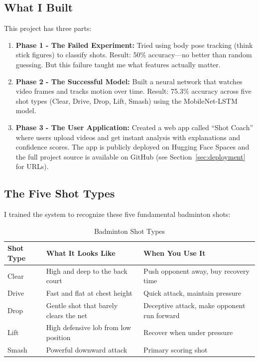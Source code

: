 \documentclass[11pt,a4paper]{article}
\begin{document}
\subsection{What I Built}

This project has three parts:

\begin{enumerate}
\item \textbf{Phase 1 - The Failed Experiment:} Tried using body pose tracking (think stick figures) to classify shots. Result: 50\% accuracy---no better than random guessing. But this failure taught me what features actually matter.

\item \textbf{Phase 2 - The Successful Model:} Built a neural network that watches video frames and tracks motion over time. Result: 75.3\% accuracy across five shot types (Clear, Drive, Drop, Lift, Smash) using the MobileNet-LSTM model.

\item \textbf{Phase 3 - The User Application:} Created a web app called ``Shot Coach'' where users upload videos and get instant analysis with explanations and confidence scores. The app is publicly deployed on Hugging Face Spaces and the full project source is available on GitHub (see Section~\ref{sec:deployment} for URLs).
\end{enumerate}

\subsection{The Five Shot Types}

I trained the system to recognize these five fundamental badminton shots:

\begin{table}[H]
\centering
\caption{Badminton Shot Types}
\begin{tabular}{p{2.5cm}p{5cm}p{5cm}}
\toprule
\textbf{Shot Type} & \textbf{What It Looks Like} & \textbf{When You Use It} \\
\midrule
Clear & High and deep to the back court & Push opponent away, buy recovery time \\
Drive & Fast and flat at chest height & Quick attack, maintain pressure \\
Drop & Gentle shot that barely clears the net & Deceptive attack, make opponent run forward \\
Lift & High defensive lob from low position & Recover when under pressure \\
Smash & Powerful downward attack & Primary scoring shot \\
\bottomrule
\end{tabular}
\end{table}
\end{document}
